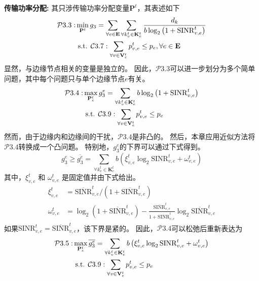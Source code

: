 \textbf{传输功率分配:} 其只涉传输功率分配变量$\mathbf{P}^{t}$，其表述如下
\begin{align}
	\mathcal{P}3.3: &\min_{\mathbf{P}^{t}} g_3= \sum_{ \forall e \in \mathbf{E}} \sum_{\forall k_{v}^{t} \in \mathbf{K}_{e}^{t}}  \frac{d_{k}}{b  \log _{2}\left(1+\mathrm{SINR}_{v, e}^t\right)} \notag \\
	&\text { s.t. } \mathcal{C}3.7: \sum_{\forall v \in \mathbf{V}_{e}^{t}} p_{v, e}^{t} \leq p_{e}, \forall e \in \mathbf{E}
\end{align}
显然，与边缘节点相关的变量是独立的。
因此，$\mathcal{P}3.3$可以进一步划分为多个简单问题，其中每个问题只与单个边缘节点$e$有关。
\begin{align}
	\mathcal{P}3.4: & \max_{\mathbf{P}_{e}^{t}}  g_3^e= \sum_{\forall k_{v}^{t} \in \mathbf{K}_{e}^{t}} {b  \log _{2}\left(1+\mathrm{SINR}_{v, e}^t\right)} \notag \\
	&\text { s.t. } \mathcal{C}3.9: \sum_{\forall v \in \mathbf{V}_{e}^{t}} p_{v, e}^{t} \leq p_{e}  
\end{align}
然而，由于边缘内和边缘间的干扰，$\mathcal{P}3.4$是非凸的。
然后，本章应用近似方法将$\mathcal{P}3.4$转换成一个凸问题。
特别地，$g_3^e$的下界可以通过下式得到\cite{papandriopoulos2006low}。
\begin{equation}
	g_3^e \geq \overline{g_3^e} = \sum_{\forall k_{v}^{t} \in \mathbf{K}_{e}^{t}} {b \left( \xi_{v, e}^{t} \log _{2}\mathrm{SINR}_{v, e}^t + \omega_{v, e}^{t} \right) }
\end{equation}
其中，$\xi_{v, e}^{t}$ 和 $\omega_{v, e}^{t}$ 是固定值并由下式给出。
\begin{align}
	\xi_{v, e}^{t} &= \overline{\mathrm{SINR}}_{v, e}^t \bigg/ ( 1 + \overline{\mathrm{SINR}}_{v, e}^t ) \\
	\omega_{v, e}^{t} &= \log _{2} (1+ \overline{\mathrm{SINR}}_{v, e}^t) - \frac{\overline{\mathrm{SINR}}_{v, e}^t}{1 + \overline{\mathrm{SINR}}_{v, e}^t} \log _{2}\overline{\mathrm{SINR}}_{v, e}^t
\end{align}
如果${\mathrm{SINR}}_{v, e}^t =\overline{\mathrm{SINR}}_{v, e}^t$，该下界是紧的。
因此，$\mathcal{P}3.4$可以松弛后重新表达为
\begin{align}
	\mathcal{P}3.5: & \max_{\mathbf{P}_{e}^{t}}  \overline{g_3^e}= \sum_{\forall k_{v}^{t} \in \mathbf{K}_{e}^{t}} {b \left( \xi_{v, e}^{t} \log _{2}\mathrm{SINR}_{v, e}^t + \omega_{v, e}^{t} \right) } \notag \\
	&\text { s.t. } \mathcal{C}3.9: \sum_{\forall v \in \mathbf{V}_{e}^{t}} p_{v, e}^{t} \leq p_{e}  
\end{align}
